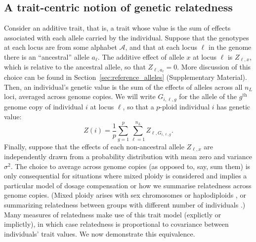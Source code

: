 \subsection{A trait-centric notion of genetic relatedness}

Consider an additive trait, that is, a trait whose value is
the sum of effects associated with each allele carried by the individual.
%
Suppose that the genotypes at each locus are from some alphabet $\mathcal{A}$,
and that at each locus $\ell$ in the genome there is an ``ancestral'' allele $a_\ell$.
%
The additive effect of allele $x$ at locus $\ell$ is $Z_{\ell,x}$,
which is relative to the ancestral allele, so that $Z_{\ell,a_\ell} = 0$.
%
More discussion of this choice can be found in Section~\ref{sec:reference_alleles} (Supplementary Material).
%
Then, an individual's genetic value is the sum of
the effects of alleles across all $n_L$ loci, %
averaged across genome copies.
%
We will write $G_{i,\ell,g}$ for %
the allele of the $g^\text{th}$ genome copy of individual $i$ at locus $\ell$,
so that a $p$-ploid individual $i$ has genetic value: %
%
$$
Z(i) = \frac{1}{p} \sum_{g=1}^p \sum_{\ell=1}^{n_L} Z_{\ell,G_{i,\ell,g}}.
$$
%
Finally, suppose that the effects of each non-ancestral allele $Z_{\ell,x}$
are independently drawn from a probability distribution with mean zero and variance $\sigma^2$.
%
The choice to average across genome copies (as opposed to, say, sum them)
is only consequential for situations where mixed ploidy is considered
and implies a particular model of dosage compensation or
how we summarise relatedness across genome copies.
%
(Mixed ploidy arises with sex chromosomes or haplodiploids \citep{grossman1989inbreeding},
or summarizing relatedness between groups with different number of individuals \citep{cockerham1976group}.)
%
Many measures of relatedness make use of this trait model (explictly or implictly),
in which case relatedness is proportional to covariance between individuals' trait values.
%
We now demonstrate this equivalence.


